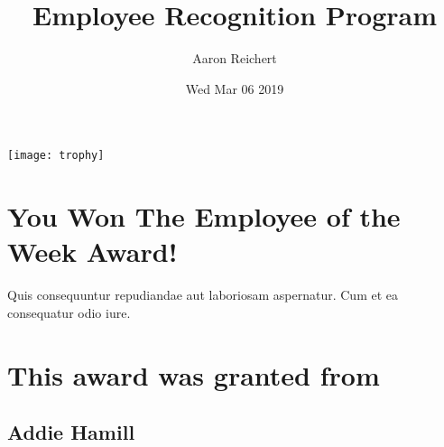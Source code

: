 \documentclass[12pt, letterpaper]{article}
\title{Employee Recognition Program}
\author{Aaron Reichert}
\date{Wed Mar 06 2019}
\begin{document}
\maketitle
\begin{center}
\texttt{[image: trophy]}
\section*{You Won The Employee of the Week Award!}
Quis consequuntur repudiandae aut laboriosam aspernatur. Cum et ea consequatur odio iure.
\section*{This award was granted from}
\subsection*{Addie Hamill}
\end{center}
\end{document}
